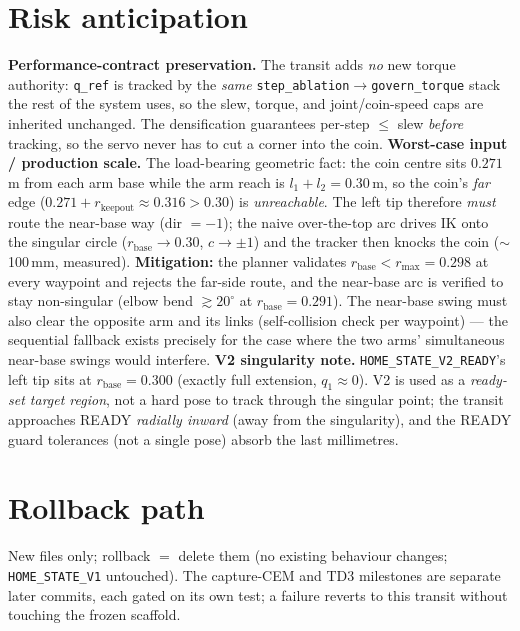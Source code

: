 \documentclass[11pt]{article}
\newcommand{\code}[1]{\texttt{\small #1}}
\begin{document}
\section{Risk anticipation}
\textbf{Performance-contract preservation.} The transit adds \emph{no} new torque authority: \code{q\_ref} is tracked by
the \emph{same} \code{step\_ablation}$\to$\code{govern\_torque} stack the rest of the system uses, so the slew, torque,
and joint/coin-speed caps are inherited unchanged. The densification guarantees per-step $\le$ slew \emph{before}
tracking, so the servo never has to cut a corner into the coin.
\smallskip\noindent\textbf{Worst-case input / production scale.} The load-bearing geometric fact: the coin centre sits
$0.271$\,m from each arm base while the arm reach is $l_1+l_2=0.30$\,m, so the coin's \emph{far} edge
($0.271+r_{\text{keepout}}\approx0.316>0.30$) is \emph{unreachable}. The left tip therefore \emph{must} route the
near-base way (dir $=-1$); the naive over-the-top arc drives IK onto the singular circle ($r_{\text{base}}\to0.30$,
$c\to\pm1$) and the tracker then knocks the coin ($\sim$100\,mm, measured). \textbf{Mitigation:} the planner validates
$r_{\text{base}}<r_{\max}=0.298$ at every waypoint and rejects the far-side route, and the near-base arc is verified to
stay non-singular (elbow bend $\gtrsim20^\circ$ at $r_{\text{base}}=0.291$). The near-base swing must also clear the
opposite arm and its links (self-collision check per waypoint) --- the sequential fallback exists precisely for the case
where the two arms' simultaneous near-base swings would interfere.
\smallskip\noindent\textbf{V2 singularity note.} \code{HOME\_STATE\_V2\_READY}'s left tip sits at $r_{\text{base}}=0.300$
(exactly full extension, $q_1\approx0$). V2 is used as a \emph{ready-set target region}, not a hard pose to track through
the singular point; the transit approaches READY \emph{radially inward} (away from the singularity), and the READY guard
tolerances (not a single pose) absorb the last millimetres.

\section{Rollback path}
New files only; rollback $=$ delete them (no existing behaviour changes; \code{HOME\_STATE\_V1} untouched). The
capture-CEM and TD3 milestones are separate later commits, each gated on its own test; a failure reverts to this transit
without touching the frozen scaffold.
\end{document}

